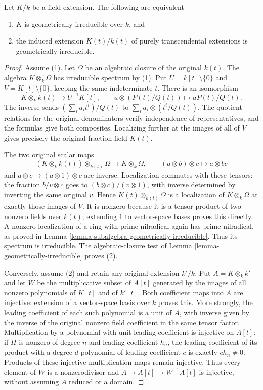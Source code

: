 \begin{lemma}
\label{lemma-geometrically-irreducible-base-change-transcendental}
Let $K/k$ be a field extension. The following are equivalent
\begin{enumerate}
\item $K$ is geometrically irreducible over $k$, and
\item the induced extension $K(t)/k(t)$ of purely transcendental extensions
is geometrically irreducible.
\end{enumerate}
\end{lemma}

\begin{proof}
Assume (1). Let $\Omega$ be an
algebraic closure of the original
$k(t)$. The algebra $K\otimes_k\Omega$
has irreducible spectrum by (1).
Put $U=k[t]\setminus\{0\}$ and
$V=K[t]\setminus\{0\}$, keeping
the same indeterminate $t$.
There is an isomorphism
$$
K\otimes_k k(t)\longrightarrow U^{-1}K[t],
\qquad a\otimes(P(t)/Q(t))\longmapsto aP(t)/Q(t).
$$
The inverse sends
$(\sum_i a_it^i)/Q(t)$ to
$\sum_i a_i\otimes(t^i/Q(t))$.
The quotient relations for the
original denominators verify
independence of representatives,
and the formulas give both composites.
Localizing further at the images
of all of $V$ gives precisely the
original fraction field $K(t)$.

The two original scalar maps
$$
(K\otimes_k k(t))\otimes_{k(t)}\Omega
\longrightarrow K\otimes_k\Omega,
\qquad(a\otimes b)\otimes c\longmapsto a\otimes bc
$$
and $a\otimes c\mapsto(a\otimes1)\otimes c$
are inverse. Localization commutes
with these tensors: the fraction
$b/v\otimes c$ goes to
$(b\otimes c)/(v\otimes1)$, with
inverse determined by inverting
the same original $v$. Hence
$K(t)\otimes_{k(t)}\Omega$ is a
localization of $K\otimes_k\Omega$
at exactly those images of $V$.
It is nonzero because it is a
tensor product of two nonzero
fields over $k(t)$; extending
$1$ to vector-space bases proves
this directly. A nonzero
localization of a ring with
prime nilradical again has prime
nilradical, as proved in Lemma
\ref{lemma-subalgebra-geometrically-irreducible}.
Thus its spectrum is irreducible.
The algebraic-closure test of Lemma
\ref{lemma-geometrically-irreducible}
proves (2).

Conversely, assume (2) and retain
any original extension $k'/k$.
Put $A=K\otimes_k k'$ and let $W$
be the multiplicative subset of
$A[t]$ generated by the images of
all nonzero polynomials of $K[t]$
and of $k'[t]$. Both coefficient
maps into $A$ are injective:
extension of a vector-space basis
over $k$ proves this. More strongly,
the leading coefficient of each
such polynomial is a unit of $A$,
with inverse given by the inverse
of the original nonzero field
coefficient in the same tensor
factor. Multiplication by a
polynomial with unit leading
coefficient is injective on $A[t]$:
if $H$ is nonzero of degree $n$
and leading coefficient $h_n$,
the leading coefficient of its
product with a degree-$d$
polynomial of leading coefficient
$c$ is exactly $c h_n\neq0$.
Products of these injective
multiplication maps remain
injective. Thus every element
of $W$ is a nonzerodivisor and
$A\to A[t]\to W^{-1}A[t]$ is
injective, without assuming $A$
reduced or a domain.


\end{proof}
